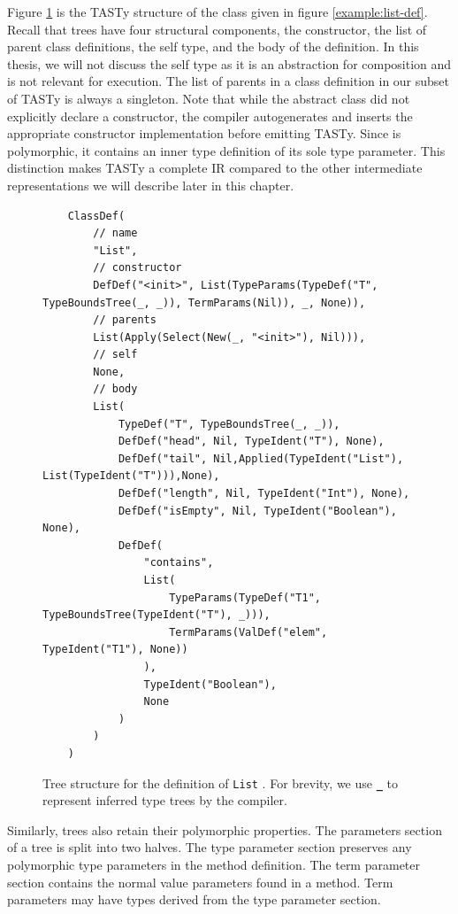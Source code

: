 Figure \ref{tasty:list} is the TASTy structure of the  class given in figure \ref{example:list-def}. 
Recall that  trees have four structural components, the constructor, the list of parent class definitions, the self type, and the body of the definition.
In this thesis, we will not discuss the self type as it is an abstraction for composition\cite{gilad:mixins,scala:calculus} and is not relevant for execution.
The list of parents in a class definition in our subset of TASTy is always a singleton.
Note that while the abstract  class did not explicitly declare a constructor, the compiler autogenerates and inserts the appropriate constructor implementation before emitting TASTy.
Since  is polymorphic, it contains an inner type definition of its sole type parameter.
This distinction makes TASTy a complete IR compared to the other intermediate representations we will describe later in this chapter.

\begin{figure}[!htb]
	\begin{verbatim}
	ClassDef(
		// name 
		"List",
		// constructor
		DefDef("<init>", List(TypeParams(TypeDef("T", TypeBoundsTree(_, _)), TermParams(Nil)), _, None)),
		// parents
		List(Apply(Select(New(_, "<init>"), Nil))),
		// self
		None,
		// body
		List(
			TypeDef("T", TypeBoundsTree(_, _)),
			DefDef("head", Nil, TypeIdent("T"), None),
			DefDef("tail", Nil,Applied(TypeIdent("List"), List(TypeIdent("T"))),None),
			DefDef("length", Nil, TypeIdent("Int"), None),
			DefDef("isEmpty", Nil, TypeIdent("Boolean"), None),
			DefDef(
				"contains",
				List(
					TypeParams(TypeDef("T1", TypeBoundsTree(TypeIdent("T"), _))),
					TermParams(ValDef("elem", TypeIdent("T1"), None))
				),
				TypeIdent("Boolean"),
				None
			)
		)
	)
	\end{verbatim} 
	\caption{Tree structure for the definition of \texttt{List} . For brevity, we use \textbf{\texttt{\_}} to represent inferred\cite{ml:type-inference} type trees by the compiler.}
	\label{tasty:list}
\end{figure}

Similarly,  trees also retain their polymorphic properties.
The parameters section of a  tree is split into two halves.
The type parameter section preserves any polymorphic type parameters in the method definition.
The term parameter section contains the normal value parameters found in a method.
Term parameters may have types derived from the type parameter section.

